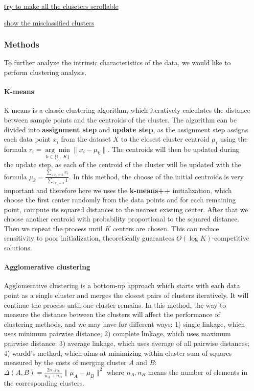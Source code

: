 \documentclass{article}
\begin{document}
\underline{try to make all the cluseters scrollable}

\underline{show the misclassified clusters}

\subsubsection*{Methods}

To further analyze the intrinsic characteristics of the data, we would like to perform clustering analysis. 

\paragraph{K-means} K-means is a classic clustering algorithm, which iteratively calculates the distance between sample points and the centroids of the cluster. The algorithm can be divided into \textbf{assignment step} and \textbf{update step}, as the assignment step assigns each data point $x_i$ from the dataset $X$ to the closest cluster centroid $\mu_i$ using the formula $r_i = \underset{k\in \{1\ldots K\} }{\arg\min}{ \|x_{i}-\mu_k\| }$. The centroids will then be updated during the
update step, as each of the centroid of the cluster will be updated with the formula $\mu_k = \frac{\sum_{i:r_i=k}^{} x_i}{\sum_{i:r_i=k}^{} 1}$. In this method, the choose of the initial centroids is very important and therefore here we uses the \textbf{k-means++} initialization, which choose the first center randomly from the data points and for each remaining point, compute its squared distances to the nearest existing center. After that we choose another centroid with
probability proportional to the squared distance. Then we repeat the process until $K$ centers are chosen. This can reduce sensitivity to poor initialization, theoretically guarantees $O(\log K)$-competitive solutions.

\paragraph{Agglomerative clustering} Agglomerative clustering is a bottom-up approach which starts with each data point as a single cluster and merges the closest pairs of clusters iteratively. It will continue the process until one cluster remains. In this method, the way to measure the distance between the clusters will affect the performance of clustering methods, and we may have for different ways: 1) single linkage, which uses minimum pairwise distance; 2) complete linkage,
which uses maximum pairwise distance; 3) average linkage, which uses average of all pairwise distances; 4) wardd's method, which aims at minimizing within-cluster sum of squares measured by the costs of merging cluster $A$ and $B$: $\Delta(A, B)=\frac{2n_An_b}{n_A+n_B}\|\mu_A-\mu_B\|^2$ where $n_A, n_B$ means the number of elements in the corresponding clusters.
\end{document}
